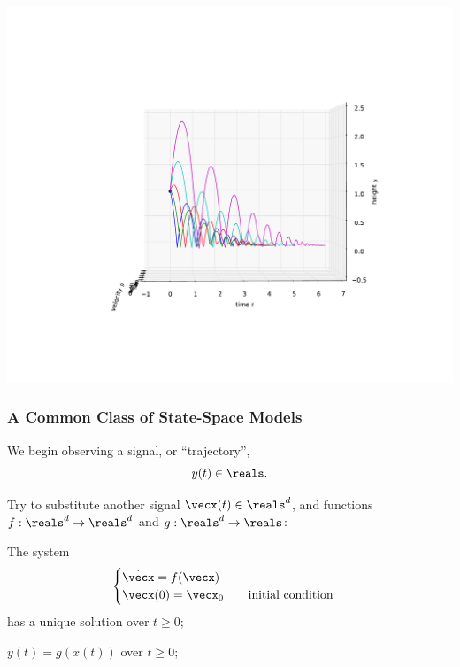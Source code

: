 \documentclass[12pt]{beamer}
\begin{document}
\begin{frame}
\vfill\centering
\includegraphics[width=.9\linewidth]{pic/bouncing_ball_reflattened}
\vfill\null
\end{frame}



\begin{frame}
\frametitle{A Common Class of State-Space Models}

\begin{itemize}

\vitem We begin observing a signal, or ``trajectory'',
\[
y(t) \in \reals.
\]



\vitem Try to substitute another signal $\vecx(t) \in \reals^d$, and
functions $f : \reals^d \to \reals^d$ and $g : \reals^d \to \reals$:

\begin{enumerate}
\vitem The system
\[
\begin{cases}
	\dot \vecx = f(\vecx) \\
	\vecx(0) = \vecx_0 \qquad \text{initial condition}
\end{cases}
\]
has a unique solution over $t \geq 0$;

\vitem $y(t) = g( x(t) )$ over $t \geq 0$;


\end{enumerate}

\end{itemize}

\vfill\null
\end{frame}
\end{document}
